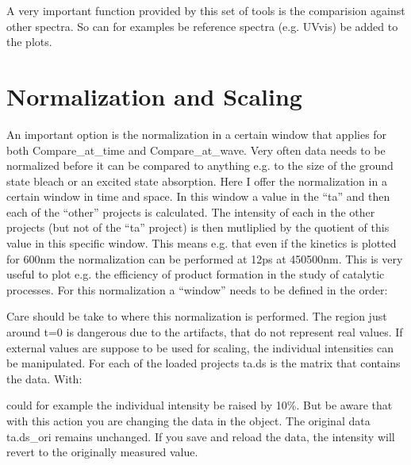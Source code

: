 \documentclass[letterpaper,10pt,english]{sphinxmanual}
\begin{document}
A very important function provided by this set of tools is the comparision against
other spectra. So can for examples be reference spectra (e.g. UV\sphinxhyphen{}vis) be added to
the plots.


\section{Normalization and Scaling}
\label{\detokenize{Comparing:normalization-and-scaling}}
An important option is the normalization in a certain window that
applies for both Compare\_at\_time and Compare\_at\_wave. Very often data
needs to be normalized before it can be compared to anything e.g. to
the size of the ground state bleach or an excited state absorption.
Here I offer the normalization in a certain window in time and space.
In this window a value in the “ta” and then each of the “other”
projects is calculated. The intensity of each in the other projects
(but not of the “ta” project) is then mutliplied by the quotient of
this value in this specific window. This means e.g. that even if the
kinetics is plotted for 600nm the normalization can be performed at
1\sphinxhyphen{}2ps at 450\sphinxhyphen{}500nm. This is very useful to plot e.g. the efficiency of
product formation in the study of catalytic processes. For this
normalization a “window” needs to be defined in the order:

\begin{sphinxVerbatim}[commandchars=\\\{\}]
\PYG{p}{[}       \PYG{p}{]}
\end{sphinxVerbatim}

Care should be take to where this normalization is performed. The region
just around t=0 is dangerous due to the artifacts, that do not represent
real values. If external values are suppose to be used for scaling, the
individual intensities can be manipulated. For each of the loaded
projects ta.ds is the matrix that contains the data. With:

\begin{sphinxVerbatim}[commandchars=\\\{\}]
\end{sphinxVerbatim}

could for example the individual intensity be raised by 10\%. But be aware
that with this action you are changing the data in the object. The original
data ta.ds\_ori remains unchanged. If you save and reload the data, the intensity
will revert to the originally measured value.
\end{document}
